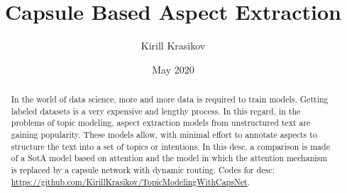 \documentclass{article}
\title{Capsule Based Aspect Extraction}
\author{Kirill Krasikov}
\date{May 2020}
\begin{document}
\maketitle
\begin{abstract}
    In the world of data science, more and more data is required to train models. Getting labeled datasets is a very expensive and lengthy process. In this regard, in the problems of topic modeling, aspect extraction models from unstructured text are gaining popularity. These models allow, with minimal effort to annotate aspects to structure the text into a set of topics or intentions. In this desc, a comparison is made of a SotA model based on attention and the model in which the attention mechanism is replaced by a capsule network with dynamic routing.
    Codes for desc: \url{https://github.com/KirillKrasikov/TopicModelingWithCapsNet}.
\end{abstract}
\end{document}
